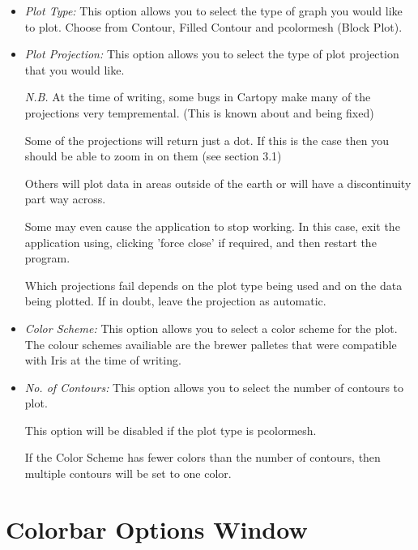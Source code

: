 \documentclass[a4paper,12pt]{article}
\begin{document}
\begin{itemize}

\item
\emph{Plot Type:} This option allows you to select the type of graph you would
like to plot. Choose from Contour, Filled Contour and pcolormesh (Block Plot).

\item
\emph{Plot Projection:} This option allows you to select the type of plot
projection that you would like.

\vspace{4mm}

\emph{N.B.} At the time of writing, some bugs in Cartopy make many of the
projections very tempremental. (This is known about and being fixed)

Some of the projections will return just a dot. If this is the case then you
should be able to zoom in on them (see section 3.1)

Others will plot data in areas outside of the earth or will have a discontinuity
part way across.

Some may even cause the application to stop working. In this case, exit the
application using, clicking 'force close' if required, and then restart the
program.

Which projections fail depends on the plot type being used and on the data
being plotted. If in doubt, leave the projection as automatic. 

\item
\emph{Color Scheme:} This option allows you to select a color scheme for the
plot. The colour schemes availiable are the brewer palletes that were compatible
with Iris at the time of writing. 

\item
\emph{No. of Contours:} This option allows you to select the number of contours
to plot.

This option will be disabled if the plot type is pcolormesh.

If the Color Scheme has fewer colors than the number of contours, then multiple
contours will be set to one color.

\end{itemize}

\pagebreak

\section{Colorbar Options Window}
\end{document}
